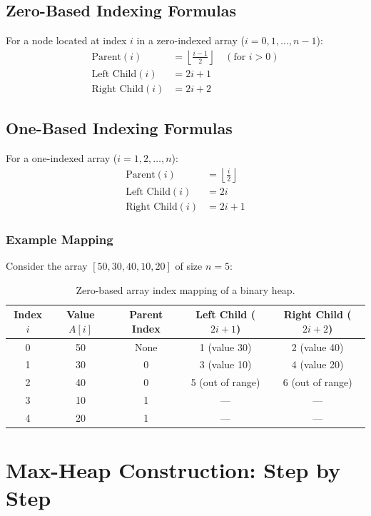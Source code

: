 \subsection{Zero-Based Indexing Formulas}
For a node located at index $i$ in a zero-indexed array ($i = 0, 1, \dots, n-1$):
\begin{align*}
\text{Parent}(i) &= \left\lfloor \frac{i - 1}{2} \right\rfloor \quad (\text{for } i > 0) \\
\text{Left Child}(i) &= 2i + 1 \\
\text{Right Child}(i) &= 2i + 2
\end{align*}

\subsection{One-Based Indexing Formulas}
For a one-indexed array ($i = 1, 2, \dots, n$):
\begin{align*}
\text{Parent}(i) &= \left\lfloor \frac{i}{2} \right\rfloor \\
\text{Left Child}(i) &= 2i \\
\text{Right Child}(i) &= 2i + 1
\end{align*}

\subsubsection{Example Mapping}
Consider the array $[50, 30, 40, 10, 20]$ of size $n=5$:
\begin{table}[htbp]
\centering
\small
\begin{tabularx}{0.85\textwidth}{ccccc}
\toprule
\textbf{Index $i$} & \textbf{Value $A[i]$} & \textbf{Parent Index} & \textbf{Left Child ($2i+1$)} & \textbf{Right Child ($2i+2$)} \\
\midrule
0 & 50 & None & 1 (value 30) & 2 (value 40) \\
1 & 30 & 0    & 3 (value 10) & 4 (value 20) \\
2 & 40 & 0    & 5 (out of range) & 6 (out of range) \\
3 & 10 & 1    & --- & --- \\
4 & 20 & 1    & --- & --- \\
\bottomrule
\end{tabularx}
\caption{Zero-based array index mapping of a binary heap.}
\end{table}

\section{Max-Heap Construction: Step by Step}

